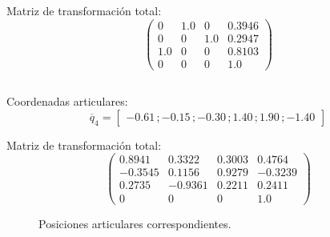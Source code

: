 \documentclass[a4paper,12pt]{article}
\begin{document}
Matriz de transformación total:
\begin{equation}
    \left(\begin{array}{cccc} 0 & 1.0 & 0 & 0.3946\\ 0 & 0 & 1.0 & 0.2947\\ 1.0 & 0 & 0 & 0.8103\\ 0 & 0 & 0 & 1.0 \end{array}\right)
    \label{T_q3}
\end{equation}

\subsection{}
Coordenadas articulares:
\begin{equation*}
    \overline{q}_4 = 
    \begin{bmatrix}
        -0.61\,;-0.15\,;-0.30\,;1.40\,;1.90\,;-1.40
    \end{bmatrix}
\end{equation*}

Matriz de transformación total:
\begin{equation}
    \left(\begin{array}{cccc} 0.8941 & 0.3322 & 0.3003 & 0.4764\\ -0.3545 & 0.1156 & 0.9279 & -0.3239\\ 0.2735 & -0.9361 & 0.2211 & 0.2411\\ 0 & 0 & 0 & 1.0 \end{array}\right)
    \label{T_q4}
\end{equation}

\begin{figure}[H]
    \centering
    \begin{adjustbox}{max width=\columnwidth}
    \end{adjustbox}
    \caption{Posiciones articulares correspondientes.}
\end{figure}
\end{document}
